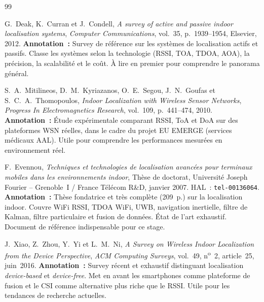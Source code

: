 \documentclass[12pt, a4paper]{article}
\begin{document}
\newpage
\begin{thebibliography}{99}

G.~Deak, K.~Curran et J.~Condell,
\textit{A survey of active and passive indoor localisation systems},
\textit{Computer Communications}, vol.~35, p.~1939--1954, Elsevier, 2012.
\newline\textbf{Annotation~:} Survey de référence sur les systèmes de localisation actifs et passifs. Classe les systèmes selon la technologie (RSSI, TOA, TDOA, AOA), la précision, la scalabilité et le coût. À lire en premier pour comprendre le panorama général.

S.~A.~Mitilineos, D.~M.~Kyriazanos, O.~E.~Segou, J.~N.~Goufas et S.~C.~A.~Thomopoulos,
\textit{Indoor Localization with Wireless Sensor Networks},
\textit{Progress In Electromagnetics Research}, vol.~109, p.~441--474, 2010.
\newline\textbf{Annotation~:} Étude expérimentale comparant RSSI, ToA et DoA sur des plateformes WSN réelles, dans le cadre du projet EU EMERGE (services médicaux AAL). Utile pour comprendre les performances mesurées en environnement réel.

F.~Evennou,
\textit{Techniques et technologies de localisation avancées pour terminaux mobiles dans les environnements indoor},
Thèse de doctorat, Université Joseph Fourier -- Grenoble~I / France Télécom R\&D,
janvier 2007. HAL~: \texttt{tel-00136064}.
\newline\textbf{Annotation~:} Thèse fondatrice et très complète (209~p.) sur la localisation indoor. Couvre WiFi RSSI, TDOA WiFi, UWB, navigation inertielle, filtre de Kalman, filtre particulaire et fusion de données. État de l'art exhaustif. Document de référence indispensable pour ce stage.

J.~Xiao, Z.~Zhou, Y.~Yi et L.~M.~Ni,
\textit{A Survey on Wireless Indoor Localization from the Device Perspective},
\textit{ACM Computing Surveys}, vol.~49, n\textsuperscript{o}~2, article~25,
juin~2016.
\newline\textbf{Annotation~:} Survey récent et exhaustif distinguant localisation \textit{device-based} et \textit{device-free}. Met en avant les smartphones comme plateforme de fusion et le CSI comme alternative plus riche que le RSSI. Utile pour les tendances de recherche actuelles.


\end{thebibliography}
\end{document}
